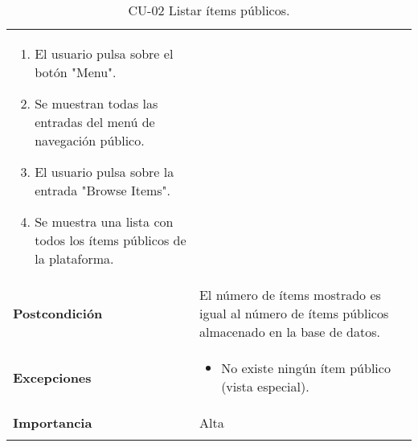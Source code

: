 \begin{longtable}[]{@{}ll@{}}
\begin{minipage}[t]{0.74\columnwidth}
\begin{enumerate}
\def\labelenumi{\arabic{enumi}.}
\tightlist
\item
  El usuario pulsa sobre el botón "Menu".
\item
  Se muestran todas las entradas del menú de navegación público.
\item
  El usuario pulsa sobre la entrada "Browse Items".
\item
  Se muestra una lista con todos los ítems públicos de la plataforma.
\end{enumerate}\strut
\end{minipage}\tabularnewline
\begin{minipage}[t]{0.20\columnwidth}\raggedright
\textbf{Postcondición}\strut
\end{minipage} & \begin{minipage}[t]{0.74\columnwidth}\raggedright
El número de ítems mostrado es igual al número de ítems públicos
almacenado en la base de datos.\strut
\end{minipage}\tabularnewline
\begin{minipage}[t]{0.20\columnwidth}\raggedright
\textbf{Excepciones}\strut
\end{minipage} & \begin{minipage}[t]{0.74\columnwidth}\raggedright
\begin{itemize}
\tightlist
\item
  No existe ningún ítem público (vista especial).
\end{itemize}\strut
\end{minipage}\tabularnewline
\begin{minipage}[t]{0.20\columnwidth}\raggedright
\textbf{Importancia}\strut
\end{minipage} & \begin{minipage}[t]{0.74\columnwidth}\raggedright
Alta\strut
\end{minipage}\tabularnewline
\bottomrule
\caption{CU-02 Listar ítems públicos.}
\end{longtable}

